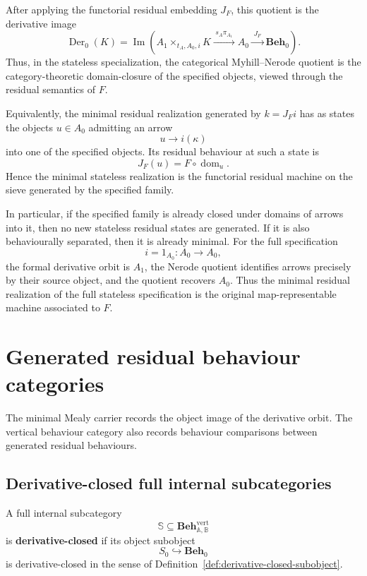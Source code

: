 After applying the functorial residual embedding \(J_F\), this quotient is the derivative image
\[
    \operatorname{Der}_0(K)
        =
    \operatorname{Im}
    \left(
        A_1\times_{t_A,A_0,i}K
            \xrightarrow{\;s_A\pi_{A_1}\;}
        A_0
            \xrightarrow{\;J_F\;}
        \mathbf{Beh}_0
    \right).
\]
Thus, in the stateless specialization, the categorical Myhill--Nerode quotient is the category-theoretic domain-closure of the specified objects, viewed through the residual semantics of \(F\).

Equivalently, the minimal residual realization generated by \(k=J_Fi\) has as states the objects \(u\in A_0\) admitting an arrow
\[
    u\to i(\kappa)
\]
into one of the specified objects. Its residual behaviour at such a state is
\[
    J_F(u)=F\circ\operatorname{dom}_u.
\]
Hence the minimal stateless realization is the functorial residual machine on the sieve generated by the specified family.

In particular, if the specified family is already closed under domains of arrows into it, then no new stateless residual states are generated. If it is also behaviourally separated, then it is already minimal. For the full specification
\[
    i=1_{A_0}:A_0\to A_0,
\]
the formal derivative orbit is \(A_1\), the Nerode quotient identifies arrows precisely by their source object, and the quotient recovers \(A_0\). Thus the minimal residual realization of the full stateless specification is the original map-representable machine associated to \(F\).

\section{Generated residual behaviour categories}
\label{sec:generated-residual-behaviour-categories}

The minimal Mealy carrier records the object image of the derivative orbit. The vertical behaviour category also records behaviour comparisons between generated residual behaviours.

\subsection{Derivative-closed full internal subcategories}
\label{subsec:derivative-closed-full-internal-subcategories}

\begin{definition}
\label{def:derivative-closed-full-subcategory}
    A full internal subcategory
    \[
        \mathbb S\subseteq
        \mathbf{Beh}^{\mathrm{vert}}_{\mathbb A,\mathbb B}
    \]
    is \textbf{derivative-closed} if its object subobject
    \[
        S_0\hookrightarrow\mathbf{Beh}_0
    \]
    is derivative-closed in the sense of Definition~\ref{def:derivative-closed-subobject}.
\end{definition}

